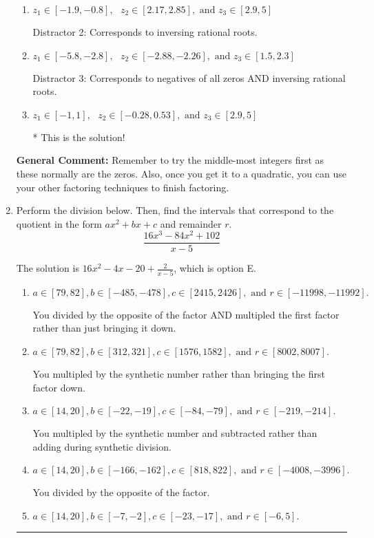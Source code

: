 \documentclass{extbook}[14pt]
\newcommand{\litem}[1]{\item #1

\rule{\textwidth}{0.4pt}}
\begin{document}
\begin{enumerate}
{\begin{enumerate}[label=\Alph*.]
 Distractor 4: Corresponds to moving factors from one rational to another.
\item \( z_1 \in [-1.9, -0.8], \text{   }  z_2 \in [2.17, 2.85], \text{   and   } z_3 \in [2.9, 5] \)

 Distractor 2: Corresponds to inversing rational roots.
\item \( z_1 \in [-5.8, -2.8], \text{   }  z_2 \in [-2.88, -2.26], \text{   and   } z_3 \in [1.5, 2.3] \)

 Distractor 3: Corresponds to negatives of all zeros AND inversing rational roots.
\item \( z_1 \in [-1, 1], \text{   }  z_2 \in [-0.28, 0.53], \text{   and   } z_3 \in [2.9, 5] \)

* This is the solution!
\end{enumerate}

\textbf{General Comment:} Remember to try the middle-most integers first as these normally are the zeros. Also, once you get it to a quadratic, you can use your other factoring techniques to finish factoring.
}
\litem{
Perform the division below. Then, find the intervals that correspond to the quotient in the form $ax^2+bx+c$ and remainder $r$.
\[ \frac{16x^{3} -84 x^{2} + 102}{x -5} \]

The solution is \( 16x^{2} -4 x -20 + \frac{2}{x -5} \), which is option E.\begin{enumerate}[label=\Alph*.]
\item \( a \in [79, 82], b \in [-485, -478], c \in [2415, 2426], \text{ and } r \in [-11998, -11992]. \)

 You divided by the opposite of the factor AND multipled the first factor rather than just bringing it down.
\item \( a \in [79, 82], b \in [312, 321], c \in [1576, 1582], \text{ and } r \in [8002, 8007]. \)

 You multipled by the synthetic number rather than bringing the first factor down.
\item \( a \in [14, 20], b \in [-22, -19], c \in [-84, -79], \text{ and } r \in [-219, -214]. \)

 You multipled by the synthetic number and subtracted rather than adding during synthetic division.
\item \( a \in [14, 20], b \in [-166, -162], c \in [818, 822], \text{ and } r \in [-4008, -3996]. \)

 You divided by the opposite of the factor.
\item \( a \in [14, 20], b \in [-7, -2], c \in [-23, -17], \text{ and } r \in [-6, 5]. \)


\end{enumerate}}
\end{enumerate}
\end{document}
